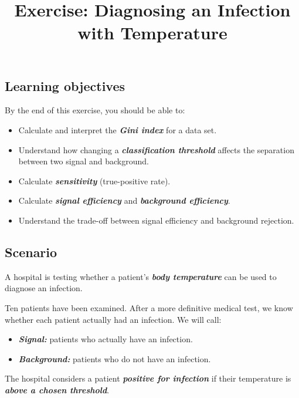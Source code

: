 \documentclass{course_sheet}
\begin{document}
\title{Exercise: Diagnosing an Infection with Temperature}
\author{}
\date{}
\maketitle
\subsection*{Learning objectives}
By the end of this exercise, you should be able to:

\begin{itemize}
\item
Calculate and interpret the \textbf{\textit{Gini index}} for a data set.

\item
Understand how changing a \textbf{\textit{classification threshold}} affects the separation between two signal and background.

\item
Calculate \textbf{\textit{sensitivity}} (true-positive rate).

\item
Calculate \textbf{\textit{signal efficiency}} and \textbf{\textit{background efficiency}}.

\item
Understand the trade-off between signal efficiency and background rejection.

\end{itemize}
\subsection*{Scenario}
A hospital is testing whether a patient's \textbf{\textit{body temperature}} can be used to diagnose an infection.

Ten patients have been examined. After a more definitive medical test, we know whether each patient actually had an infection. We will call:

\begin{itemize}
\item
\textbf{\textit{Signal:}} patients who actually have an infection.

\item
\textbf{\textit{Background:}} patients who do not have an infection.

\end{itemize}
The hospital considers a patient \textbf{\textit{positive for infection}} if their temperature is \textbf{\textit{above a chosen threshold}}.
\end{document}
